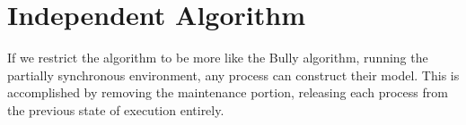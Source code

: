 

\section{Independent Algorithm}

If we restrict the algorithm to be more like the Bully algorithm, running the partially synchronous environment, any process can construct their model.
This is accomplished by removing the maintenance portion, releasing each process from the previous state of execution entirely.




